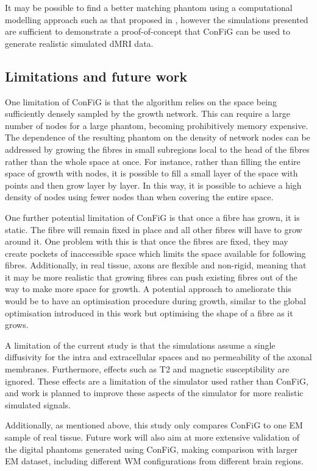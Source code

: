  It may be possible to find a better matching phantom using a computational modelling approach such as that proposed in \cite{Nedjati-Gilani2017}, however the simulations presented are sufficient to demonstrate a proof-of-concept that ConFiG can be used to generate realistic simulated dMRI data.

\subsection*{Limitations and future work}
\label{sec:config_limitations_future}
One limitation of ConFiG is that the algorithm relies on the space being sufficiently densely sampled by the growth network. This can require a large number of nodes for a large phantom, becoming prohibitively memory expensive. The dependence of the resulting phantom on the density of network nodes can be addressed by growing the fibres in small subregions local to the head of the fibres rather than the whole space at once. For instance, rather than filling the entire space of growth with nodes, it is possible to fill a small layer of the space with points and then grow layer by layer. In this way, it is possible to achieve a high density of nodes using fewer nodes than when covering the entire space.

One further potential limitation of ConFiG is that once a fibre has grown, it is static. The fibre will remain fixed in place and all other fibres will have to grow around it. One problem with this is that once the fibres are fixed, they may create pockets of inaccessible space which limits the space available for following fibres. Additionally, in real tissue, axons are flexible and non-rigid, meaning that it may be more realistic that growing fibres can push existing fibres out of the way to make more space for growth. A potential approach to ameliorate this would be to have an optimisation procedure during growth, similar to the global optimisation introduced in this work but optimising the shape of a fibre as it grows.

A limitation of the current study is that the simulations assume a single diffusivity for the intra and extracellular spaces and no permeability of the axonal membranes. Furthermore, effects such as T2 and magnetic susceptibility are ignored. These effects are a limitation of the simulator used rather than ConFiG, and work is planned to improve these aspects of the simulator for more realistic simulated signals.

Additionally, as mentioned above, this study only compares ConFiG to one EM sample of real tissue. Future work will also aim at more extensive validation of the digital phantoms generated using ConFiG, making comparison with larger EM dataset, including different WM configurations from different brain regions.

